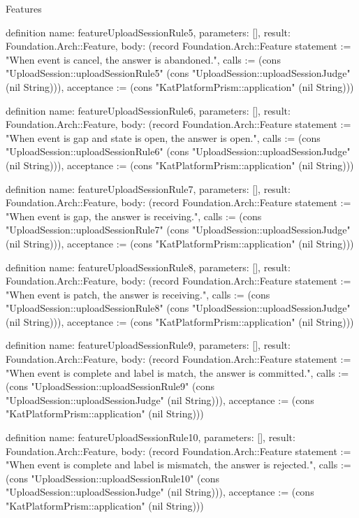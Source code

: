 \begin{lexlean}{Features}
\begin{semanticmodule}
definition{
  name: featureUploadSessionRule5,
  parameters: [],
  result: Foundation.Arch::Feature,
  body: (record Foundation.Arch::Feature {statement := "When event is cancel, the answer is abandoned.", calls := (cons "UploadSession::uploadSessionRule5" (cons "UploadSession::uploadSessionJudge" (nil String))), acceptance := (cons "KatPlatformPrism::application" (nil String))})
}

definition{
  name: featureUploadSessionRule6,
  parameters: [],
  result: Foundation.Arch::Feature,
  body: (record Foundation.Arch::Feature {statement := "When event is gap and state is open, the answer is open.", calls := (cons "UploadSession::uploadSessionRule6" (cons "UploadSession::uploadSessionJudge" (nil String))), acceptance := (cons "KatPlatformPrism::application" (nil String))})
}

definition{
  name: featureUploadSessionRule7,
  parameters: [],
  result: Foundation.Arch::Feature,
  body: (record Foundation.Arch::Feature {statement := "When event is gap, the answer is receiving.", calls := (cons "UploadSession::uploadSessionRule7" (cons "UploadSession::uploadSessionJudge" (nil String))), acceptance := (cons "KatPlatformPrism::application" (nil String))})
}

definition{
  name: featureUploadSessionRule8,
  parameters: [],
  result: Foundation.Arch::Feature,
  body: (record Foundation.Arch::Feature {statement := "When event is patch, the answer is receiving.", calls := (cons "UploadSession::uploadSessionRule8" (cons "UploadSession::uploadSessionJudge" (nil String))), acceptance := (cons "KatPlatformPrism::application" (nil String))})
}

definition{
  name: featureUploadSessionRule9,
  parameters: [],
  result: Foundation.Arch::Feature,
  body: (record Foundation.Arch::Feature {statement := "When event is complete and label is match, the answer is committed.", calls := (cons "UploadSession::uploadSessionRule9" (cons "UploadSession::uploadSessionJudge" (nil String))), acceptance := (cons "KatPlatformPrism::application" (nil String))})
}

definition{
  name: featureUploadSessionRule10,
  parameters: [],
  result: Foundation.Arch::Feature,
  body: (record Foundation.Arch::Feature {statement := "When event is complete and label is mismatch, the answer is rejected.", calls := (cons "UploadSession::uploadSessionRule10" (cons "UploadSession::uploadSessionJudge" (nil String))), acceptance := (cons "KatPlatformPrism::application" (nil String))})
}


\end{semanticmodule}
\end{lexlean}
